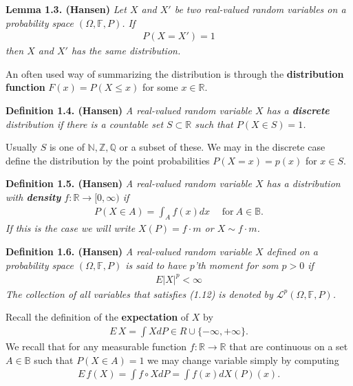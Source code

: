 \documentclass[a4paper,12pt,openany]{book}
\begin{document}
\textbf{Lemma 1.3. (Hansen)} \emph{Let \(X\) and \(X'\) be two real-valued random variables on a probability space \((\Omega,\mathbb{F},P)\). If}
\begin{align*}
    P(X=X')=1
\end{align*}
\emph{then \(X\) and \(X'\) has the same distribution.}

An often used way of summarizing the distribution is through the \textbf{distribution function} \(F(x)=P(X\le x)\) for some \(x\in\mathbb{R}\).

\textbf{Definition 1.4. (Hansen)} \emph{A real-valued random variable \(X\) has a \textbf{discrete} distribution if there is a countable set \(S\subset\mathbb{R}\) such that \(P(X\in S)=1\).}

Usually \(S\) is one of \(\mathbb{N},\mathbb{Z},\mathbb{Q}\) or a subset of these. We may in the discrete case define the distribution by the point probabilities \(P(X=x)=p(x)\) for \(x\in S\).

\textbf{Definition 1.5. (Hansen)} \emph{A real-valued random variable \(X\) has a distribution with \textbf{density} \(f : \mathbb{R}\to [0,\infty)\) if}
\begin{align*}
    P(X\in A)=\int_Af(x)dx\hspace{15pt}\text{for}\ A\in \mathbb{B}.\tag{1.5}
\end{align*}
\emph{If this is the case we will write \(X(P)=f\cdot m\) or \(X\sim f\cdot m\).}

\textbf{Definition 1.6. (Hansen)} \emph{A real-valued random variable \(X\) defined on a probability space \((\Omega, \mathbb{F},P)\) is said to have \(p\)'th moment for som \(p>0\) if}
\begin{align*}
    E\vert X\vert^p<\infty\tag{1.12}
\end{align*}
\emph{The collection of all variables that satisfies (1.12) is denoted by \(\mathcal{L}^p(\Omega,\mathbb{F},P)\).}

Recall the definition of the \textbf{expectation} of \(X\) by
\begin{align*}
    E\, X=\int XdP \in R\cup \{-\infty,+\infty\}.\tag{1.11}
\end{align*}
We recall that for any measurable function \(f : \mathbb{R}\to \mathbb{R}\) that are continuous on a set \(A\in\mathbb{B}\) such that \(P(X\in A)=1\) we may change variable simply by computing
\begin{align*}
    E\, f(X)=\int f\circ XdP=\int f(x)dX(P)(x).
\end{align*}
\end{document}
